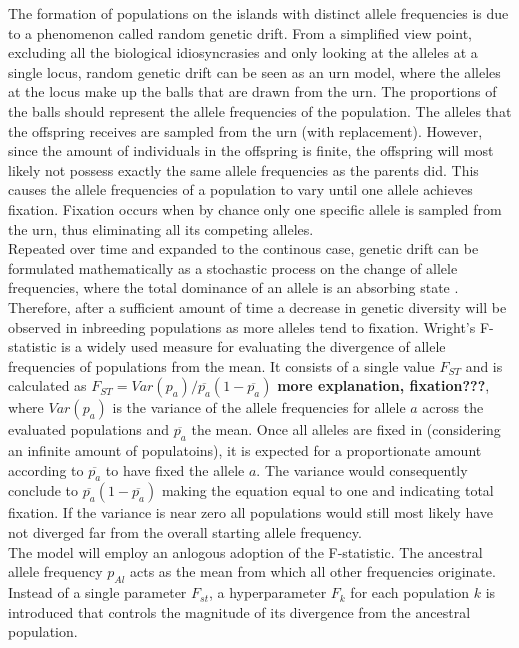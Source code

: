 \documentclass[a4paper, 11pt]{article}
\begin{document}
The formation of populations on the islands with distinct allele frequencies is due to a phenomenon called random genetic drift. From a simplified view point, excluding all the biological idiosyncrasies and only looking at the alleles at a single locus, random genetic drift can be seen as an urn model, where the alleles at the locus make up the balls that are drawn from the urn. The proportions of the balls should represent the allele frequencies of the population. The alleles that the offspring receives are sampled from the urn (with replacement). However, since the amount of individuals in the offspring is finite, the offspring will most likely not possess exactly the same allele frequencies as the parents did. This causes the allele frequencies of a population to vary until one allele achieves fixation. Fixation occurs when by chance only one specific allele is sampled from the urn, thus eliminating all its competing alleles.\\

Repeated over time and expanded to the continous case, genetic drift can be formulated mathematically as a stochastic process on the change of allele frequencies, where the total dominance of an allele is an absorbing state \parencite{crow1970introduction}. Therefore, after a sufficient amount of time a decrease in genetic diversity will be observed in inbreeding populations as more alleles tend to fixation. Wright's F-statistic is a widely used measure for evaluating the divergence of allele frequencies of populations from the mean. It consists of a single value $F_{ST}$ and is calculated as $F_{ST} = Var(p_a) / \overline{p_a}(1-\overline{p_a})$ \textbf{more explanation, fixation???}, where $Var(p_a)$ is the variance of the allele frequencies for allele $a$ across the evaluated populations and $\overline{p_a}$ the mean. Once all alleles are fixed in (considering an infinite amount of populatoins), it is expected for a proportionate amount according to $\overline{p_a}$ to have fixed the allele $a$. The variance would consequently conclude to $\overline{p_a}(1-\overline{p_a})$ making the equation equal to one and indicating total fixation. If the variance is near zero all populations would still most likely have not diverged far from the overall starting allele frequency.\\

The model will employ an anlogous adoption of the F-statistic. The ancestral allele frequency $p_{Al}$ acts as the mean from which all other frequencies originate. Instead of a single parameter $F_{st}$, a hyperparameter $F_k$ for each population $k$ is introduced that controls the magnitude of its divergence from the ancestral population.\\
\end{document}

